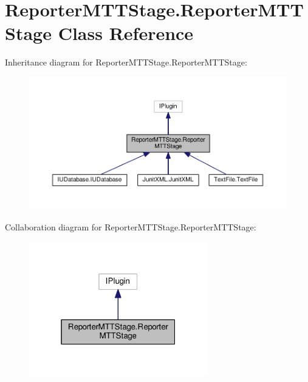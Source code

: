 \hypertarget{classReporterMTTStage_1_1ReporterMTTStage}{\section{Reporter\-M\-T\-T\-Stage.\-Reporter\-M\-T\-T\-Stage Class Reference}
\label{classReporterMTTStage_1_1ReporterMTTStage}
}


Inheritance diagram for Reporter\-M\-T\-T\-Stage.\-Reporter\-M\-T\-T\-Stage\-:
\nopagebreak
\begin{figure}[H]
\begin{center}
\leavevmode
\includegraphics[width=350pt]{classReporterMTTStage_1_1ReporterMTTStage__inherit__graph}
\end{center}
\end{figure}


Collaboration diagram for Reporter\-M\-T\-T\-Stage.\-Reporter\-M\-T\-T\-Stage\-:
\nopagebreak
\begin{figure}[H]
\begin{center}
\leavevmode
\includegraphics[width=220pt]{classReporterMTTStage_1_1ReporterMTTStage__coll__graph}
\end{center}
\end{figure}
